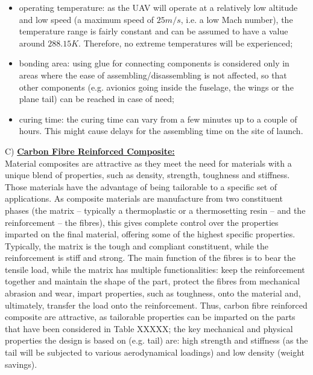 \documentclass[12pt]{article}
\begin{document}
\begin{itemize}
\item operating temperature: as the UAV will operate at a relatively low altitude and low speed (a maximum speed of $25m/s$, i.e. a low Mach number), the temperature range is fairly constant and can be assumed to have a value around $288.15K$. Therefore, no extreme temperatures will be experienced;
\item bonding area: using glue for connecting components is considered only in areas where the ease of assembling/disassembling is not affected, so that other components (e.g. avionics going inside the fuselage, the wings or the plane tail) can be reached in case of need;
\item curing time: the curing time can vary from a few minutes up to a couple of hours. This might cause delays for the assembling time on the site of launch.
\end{itemize}

C) \textbf{\underline{Carbon Fibre Reinforced Composite: }}\\

\noindent Material composites are attractive as they meet the need for materials with a unique blend of properties, such as density, strength, toughness and stiffness. Those materials have the advantage of being tailorable to a specific set of applications. As composite materials are manufacture from two constituent phases (the matrix – typically a thermoplastic or a thermosetting resin – and the reinforcement – the fibres), this gives complete control over the properties imparted on the final material, offering some of the highest specific properties. Typically, the matrix is the tough and compliant constituent, while the reinforcement is stiff and strong. The main function of the fibres is to bear the tensile load, while the matrix has multiple functionalities: keep the reinforcement together and maintain the shape of the part, protect the fibres from mechanical abrasion and wear, impart properties, such as toughness, onto the material and, ultimately, transfer the load onto the reinforcement. Thus, carbon fibre reinforced composite are attractive, as tailorable properties can be imparted on the parts that have been considered in Table XXXXX; the key mechanical and physical properties the design is based on (e.g. tail) are: high strength and stiffness (as the tail will be subjected to various aerodynamical loadings) and low density (weight savings). \cite{COMPOSITEREF} \\
\end{document}
